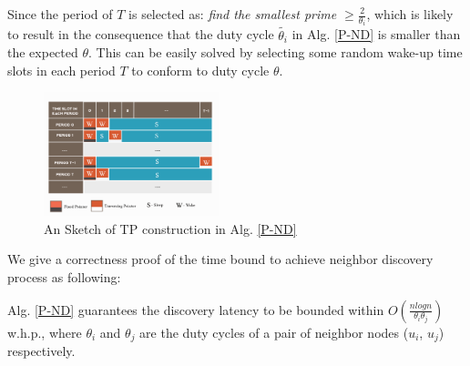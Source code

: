  \begin{remark}
Since the period of $T$ is selected as: 
\emph{find the smallest prime $\geq \frac{2}{\theta_i}$},
which is likely to result in the consequence that the duty 
cycle $\widetilde{\theta_i}$ in Alg. \ref{P-ND} is smaller than the expected
$\theta$. This can be easily solved by selecting some random wake-up time slots 
in each period $T$ to conform to duty cycle $\theta$.
\end{remark}

\begin{figure}[!h]
\centering
\includegraphics[width=2in]{./Figure/TP}
\caption{An Sketch of TP construction in Alg. \ref{P-ND}}
\label{TP}
\end{figure}

We give a correctness proof of the time 
bound to achieve neighbor discovery process as following:


\begin{theorem}
\label{PBND1}
Alg. \ref{P-ND} guarantees the discovery latency
to be bounded within $O(\frac{nlogn}{\theta_i\theta_j})$ w.h.p.,
where $\theta_i$ and $\theta_j$ are the duty cycles of 
a pair of neighbor nodes ($u_i$, $u_j$) respectively.
\end{theorem}



